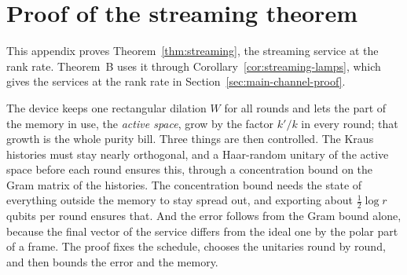 \section{Proof of the streaming theorem}\label{app:streaming}

This appendix proves Theorem~\ref{thm:streaming}, the streaming service at the rank rate. Theorem~B uses it through
Corollary~\ref{cor:streaming-lamps}, which gives the services at the rank rate in Section~\ref{sec:main-channel-proof}.

The device keeps one rectangular dilation $W$ for all rounds and lets the part of the memory in use, the \emph{active space}, grow by the
factor $k'/k$ in every round; that growth is the whole purity bill. Three things are then controlled. The Kraus histories must stay nearly
orthogonal, and a Haar-random unitary of the active space before each round ensures this, through a concentration bound on the Gram matrix of
the histories. The concentration bound needs the state of everything outside the memory to stay spread out, and exporting about
$\frac12\log r$ qubits per round ensures that. And the error follows from the Gram bound alone, because the final vector of the service differs
from the ideal one by the polar part of a frame. The proof fixes the schedule, chooses the unitaries round by round, and then bounds the error
and the memory.

